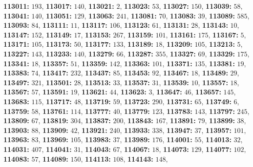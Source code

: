 \textsf{\bfseries 113011:} $193$, \textsf{\bfseries 113017:} $140$, \textsf{\bfseries 113021:} $2$, \textsf{\bfseries 113023:} $53$, \textsf{\bfseries 113027:} $150$, \textsf{\bfseries 113039:} $58$, \textsf{\bfseries 113041:} $140$, \textsf{\bfseries 113051:} $129$, \textsf{\bfseries 113063:} $241$, \textsf{\bfseries 113081:} $70$, \textsf{\bfseries 113083:} $39$, \textsf{\bfseries 113089:} $585$, \textsf{\bfseries 113093:} $84$, \textsf{\bfseries 113111:} $11$, \textsf{\bfseries 113117:} $106$, \textsf{\bfseries 113123:} $61$, \textsf{\bfseries 113131:} $28$, \textsf{\bfseries 113143:} $10$, \textsf{\bfseries 113147:} $152$, \textsf{\bfseries 113149:} $17$, \textsf{\bfseries 113153:} $267$, \textsf{\bfseries 113159:} $101$, \textsf{\bfseries 113161:} $175$, \textsf{\bfseries 113167:} $5$, \textsf{\bfseries 113171:} $105$, \textsf{\bfseries 113173:} $50$, \textsf{\bfseries 113177:} $133$, \textsf{\bfseries 113189:} $18$, \textsf{\bfseries 113209:} $105$, \textsf{\bfseries 113213:} $5$, \textsf{\bfseries 113227:} $143$, \textsf{\bfseries 113233:} $140$, \textsf{\bfseries 113279:} $66$, \textsf{\bfseries 113287:} $355$, \textsf{\bfseries 113327:} $69$, \textsf{\bfseries 113329:} $175$, \textsf{\bfseries 113341:} $18$, \textsf{\bfseries 113357:} $51$, \textsf{\bfseries 113359:} $142$, \textsf{\bfseries 113363:} $101$, \textsf{\bfseries 113371:} $135$, \textsf{\bfseries 113381:} $19$, \textsf{\bfseries 113383:} $74$, \textsf{\bfseries 113417:} $232$, \textsf{\bfseries 113437:} $85$, \textsf{\bfseries 113453:} $92$, \textsf{\bfseries 113467:} $18$, \textsf{\bfseries 113489:} $29$, \textsf{\bfseries 113497:} $321$, \textsf{\bfseries 113501:} $28$, \textsf{\bfseries 113513:} $33$, \textsf{\bfseries 113537:} $31$, \textsf{\bfseries 113539:} $10$, \textsf{\bfseries 113557:} $18$, \textsf{\bfseries 113567:} $57$, \textsf{\bfseries 113591:} $19$, \textsf{\bfseries 113621:} $44$, \textsf{\bfseries 113623:} $3$, \textsf{\bfseries 113647:} $46$, \textsf{\bfseries 113657:} $145$, \textsf{\bfseries 113683:} $115$, \textsf{\bfseries 113717:} $48$, \textsf{\bfseries 113719:} $59$, \textsf{\bfseries 113723:} $290$, \textsf{\bfseries 113731:} $65$, \textsf{\bfseries 113749:} $6$, \textsf{\bfseries 113759:} $58$, \textsf{\bfseries 113761:} $114$, \textsf{\bfseries 113777:} $40$, \textsf{\bfseries 113779:} $123$, \textsf{\bfseries 113783:} $143$, \textsf{\bfseries 113797:} $245$, \textsf{\bfseries 113809:} $67$, \textsf{\bfseries 113819:} $304$, \textsf{\bfseries 113837:} $200$, \textsf{\bfseries 113843:} $167$, \textsf{\bfseries 113891:} $79$, \textsf{\bfseries 113899:} $38$, \textsf{\bfseries 113903:} $88$, \textsf{\bfseries 113909:} $42$, \textsf{\bfseries 113921:} $240$, \textsf{\bfseries 113933:} $338$, \textsf{\bfseries 113947:} $37$, \textsf{\bfseries 113957:} $101$, \textsf{\bfseries 113963:} $83$, \textsf{\bfseries 113969:} $105$, \textsf{\bfseries 113983:} $37$, \textsf{\bfseries 113989:} $176$, \textsf{\bfseries 114001:} $55$, \textsf{\bfseries 114013:} $32$, \textsf{\bfseries 114031:} $407$, \textsf{\bfseries 114041:} $31$, \textsf{\bfseries 114043:} $67$, \textsf{\bfseries 114067:} $18$, \textsf{\bfseries 114073:} $129$, \textsf{\bfseries 114077:} $102$, \textsf{\bfseries 114083:} $57$, \textsf{\bfseries 114089:} $150$, \textsf{\bfseries 114113:} $108$, \textsf{\bfseries 114143:} $148$, 
